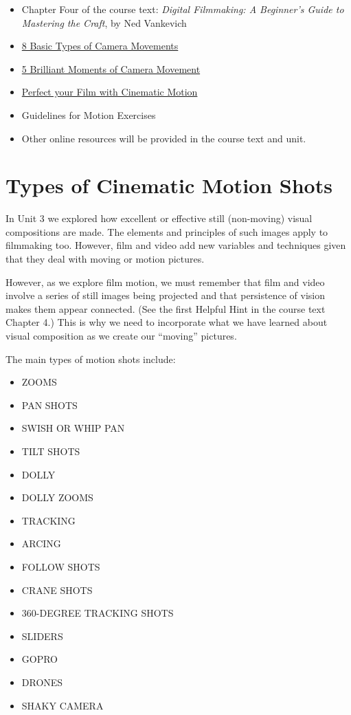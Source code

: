 \documentclass[
  letterpaper,
  DIV=11,
  numbers=noendperiod]{scrreprt}
\providecommand{\tightlist}{%
  \setlength{\itemsep}{0pt}\setlength{\parskip}{0pt}}\usepackage{longtable,booktabs,array}
\begin{document}
\begin{itemize}
\tightlist
\item
  Chapter Four of the course text: \emph{Digital Filmmaking: A
  Beginner's Guide to Mastering the Craft}, by Ned Vankevich
\item
  \href{https://www.youtube.com/watch?v=g6zMtnLC50w}{8 Basic Types of
  Camera Movements}
\item
  \href{https://www.youtube.com/watch?v=h2c3JZ6X3f8}{5 Brilliant Moments
  of Camera Movement}
\item
  \href{https://www.youtube.com/watch?v=VPfKsdPsS5w}{Perfect your Film
  with Cinematic Motion}
\item
  Guidelines for Motion Exercises
\item
  Other online resources will be provided in the course text and unit.
\end{itemize}

\section{Types of Cinematic Motion
Shots}\label{types-of-cinematic-motion-shots}

In Unit 3 we explored how excellent or effective still (non-moving)
visual compositions are made. The elements and principles of such images
apply to filmmaking too. However, film and video add new variables and
techniques given that they deal with moving or motion pictures.

However, as we explore film motion, we must remember that film and video
involve a series of still images being projected and that persistence of
vision makes them appear connected. (See the first Helpful Hint in the
course text Chapter 4.) This is why we need to incorporate what we have
learned about visual composition as we create our ``moving'' pictures.

The main types of motion shots include:

\begin{itemize}
\tightlist
\item
  ZOOMS
\item
  PAN SHOTS
\item
  SWISH OR WHIP PAN
\item
  TILT SHOTS
\item
  DOLLY
\item
  DOLLY ZOOMS
\item
  TRACKING
\item
  ARCING
\item
  FOLLOW SHOTS
\item
  CRANE SHOTS
\item
  360-DEGREE TRACKING SHOTS
\item
  SLIDERS
\item
  GOPRO
\item
  DRONES
\item
  SHAKY CAMERA
\end{itemize}
\end{document}
